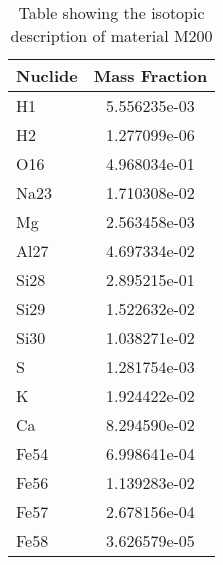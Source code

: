 \begin{centering}
\begin{table}[ht!]
\begin{tabular}{l | c}
\hline
Nuclide & Mass Fraction\\
\hline
H1 & 5.556235e-03\\
H2 & 1.277099e-06\\
O16 & 4.968034e-01\\
Na23 & 1.710308e-02\\
Mg & 2.563458e-03\\
Al27 & 4.697334e-02\\
Si28 & 2.895215e-01\\
Si29 & 1.522632e-02\\
Si30 & 1.038271e-02\\
S & 1.281754e-03\\
K & 1.924422e-02\\
Ca & 8.294590e-02\\
Fe54 & 6.998641e-04\\
Fe56 & 1.139283e-02\\
Fe57 & 2.678156e-04\\
Fe58 & 3.626579e-05
\end{tabular}
\caption{Table showing the isotopic description of material M200}
\label{table:material_M200}
\end{table}\clearpage


\end{centering}
